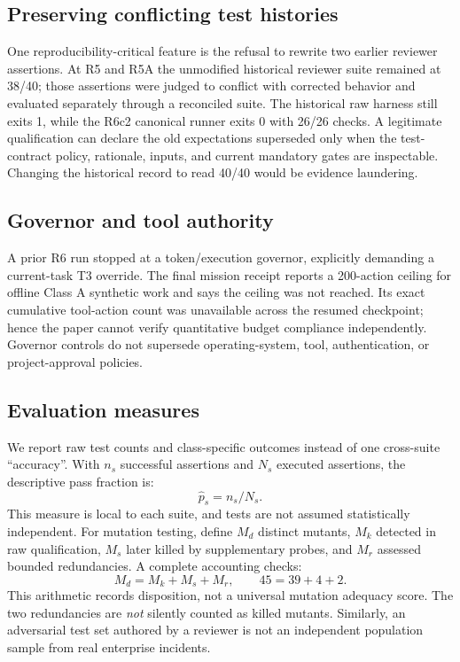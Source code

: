 \documentclass[11pt,twocolumn]{article}
\begin{document}
\subsection{Preserving conflicting test histories}
One reproducibility-critical feature is the refusal to rewrite two earlier reviewer assertions. At R5 and R5A the unmodified historical reviewer suite remained at 38/40; those assertions were judged to conflict with corrected behavior and evaluated separately through a reconciled suite. The historical raw harness still exits 1, while the R6c2 canonical runner exits 0 with 26/26 checks. A legitimate qualification can declare the old expectations superseded only when the test-contract policy, rationale, inputs, and current mandatory gates are inspectable. Changing the historical record to read 40/40 would be evidence laundering.

\subsection{Governor and tool authority}
A prior R6 run stopped at a token/execution governor, explicitly demanding a current-task T3 override. The final mission receipt reports a 200-action ceiling for offline Class A synthetic work and says the ceiling was not reached. Its exact cumulative tool-action count was unavailable across the resumed checkpoint; hence the paper cannot verify quantitative budget compliance independently. Governor controls do not supersede operating-system, tool, authentication, or project-approval policies.

\subsection{Evaluation measures}
We report raw test counts and class-specific outcomes instead of one cross-suite ``accuracy''. With $n_s$ successful assertions and $N_s$ executed assertions, the descriptive pass fraction is:
\begin{equation}
\widehat{p}_{s}=n_s/N_s.
\label{eq:pass}
\end{equation}
This measure is local to each suite, and tests are not assumed statistically independent. For mutation testing, define $M_d$ distinct mutants, $M_k$ detected in raw qualification, $M_s$ later killed by supplementary probes, and $M_r$ assessed bounded redundancies. A complete accounting checks:
\begin{equation}
M_d=M_k+M_s+M_r,\qquad 45=39+4+2.
\label{eq:mutation}
\end{equation}
This arithmetic records disposition, not a universal mutation adequacy score. The two redundancies are \emph{not} silently counted as killed mutants. Similarly, an adversarial test set authored by a reviewer is not an independent population sample from real enterprise incidents.
\end{document}
